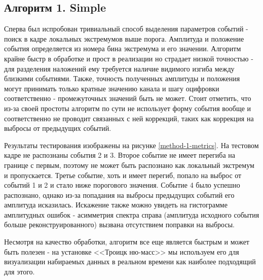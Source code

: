 \documentclass[a4paper,14pt]{extreport}
\begin{document}
\subsection{Алгоритм 1. Simple}
Сперва был испробован тривиальный способ выделения параметров событий - поиск в кадре локальных экстремумов выше порога. Амплитуда и положение события определяется из номера бина экстремума и его значении.
Алгоритм крайне быстр в обработке и прост в реализации но страдает низкой точностью - для разделения наложений ему требуется наличие видимого изгиба между близкими событиями. Также, точность полученных амплитуды и положения могут принимать только кратные значению канала и шагу оцифровки соответственно - промежуточных значений быть не может. Стоит отметить, что из-за своей простоты алгоритм по сути не использует форму события вообще и соответственно не проводит связанных с ней коррекций, таких как коррекция на выбросы от предыдущих событий.

Результаты тестирования изображены на рисунке \ref{method-1-metrics}. На тестовом кадре не распознаны события 2 и 3. Второе событие не имеет перегиба на границе с первым, поэтому не может быть распознано как локальный экстремум и пропускается. Третье событие, хоть и имеет перегиб, попало на выброс от событий 1 и 2 и стало ниже порогового значения. Событие 4 было успешно распознано, однако из-за попадания на выбросы предыдущих событий его амплитуда исказилась. Искажение также можно увидеть на гистограмме амплитудных ошибок - асимметрия спектра справа (амплитуда исходного события больше реконструированного) вызвана отсутствием поправки на выбросы.

Несмотря на качество обработки, алгоритм все еще является быстрым и может быть полезен - на установке <<Троицк ню-масс>> мы используем его для визуализации набираемых данных в реальном времени как наиболее подходящий для этого.
\end{document}
